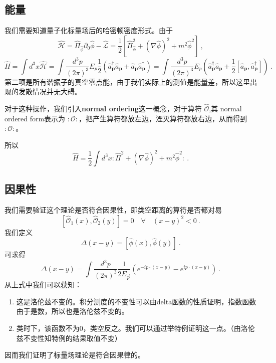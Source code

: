 \subsection{能量}
我们需要知道量子化标量场后的哈密顿密度形式。由于
\begin{equation}
\hat{\mathcal{H}}=\hat{\Pi}_{\hat{\phi}} \partial_{0} \hat{\phi}-\hat{\mathcal{L}}=\frac{1}{2}\left[\hat{\Pi}_{\hat{\phi}}^{2}+(\nabla \hat{\phi})^{2}+m^{2} \hat{\phi}^{2}\right]~,
\end{equation}
\begin{equation}
\hat{H}=\int d^{3} x \hat{\mathcal{H}}=\int \frac{d^{3} p}{(2 \pi)^{3}} E_{p} \frac{1}{2}\left(\hat{a}_{\mathbf{p}}^{\dagger} \hat{a}_{\mathbf{p}}+\hat{a}_{\mathbf{p}} \hat{a}_{\mathbf{p}}^{\dagger}\right)=\int \frac{d^{3} p}{(2 \pi)^{3}} E_{p}\left(\hat{a}_{\mathbf{p}}^{\dagger} \hat{a}_{\mathbf{p}}+\frac{1}{2}\left[\hat{a}_{\mathbf{p}}, \hat{a}_{\mathbf{p}}^{\dagger}\right]\right)~.
\end{equation}
第二项是所有谐振子的真空零点能，由于我们实际上的测值是能量差，所以这里出现的发散情况并无大碍。

对于这种操作，我们引入\textbf{normal ordering}这一概念，对于算符 $\hat{\mathcal{O}}$,其 normal ordered form表示为 $:\mathcal{O}:$，把产生算符都放左边，湮灭算符都放右边，从而得到 $:\mathcal{O}:$。

所以
\begin{equation}
\hat{H}=\frac{1}{2} \int d^{3} x: \hat{\Pi}^{2}+(\nabla \hat{\phi})^{2}+m^{2} \hat{\phi}^{2}:~.
\end{equation}

\subsection{因果性}
我们需要验证这个理论是否符合因果性，即类空距离的算符是否都对易
\begin{equation}
\left[\mathcal{\hat{O}}_{1}(x), \mathcal{\hat{O}}_{2}(y)\right]=0 \quad \forall \quad(x-y)^{2}<0~.
\end{equation}
我们定义
\begin{equation}
\Delta(x-y)=[\hat{\phi}(x), \hat{\phi}(y)]~.
\end{equation}
可求得
\begin{equation}
\Delta(x-y)=\int \frac{d^{3} p}{(2 \pi)^{3}} \frac{1}{2 E_{\vec{p}}}\left(e^{-i p \cdot(x-y)}-e^{i p \cdot(x-y)}\right)~.
\end{equation}
从上式中我们可以获知：
\begin{enumerate}
\item 这是洛伦兹不变的。积分测度的不变性可以由delta函数的性质证明，指数函数由于是数，所以也是洛伦兹不变的。
\item 类时下，该函数不为0，类空反之。我们可以通过举特例证明这一点。（由洛伦兹不变性知特例的结果取值不变）
\end{enumerate}
因而我们证明了标量场理论是符合因果律的。

